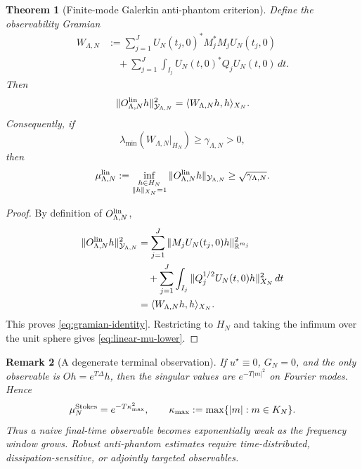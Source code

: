 \documentclass[11pt]{article}
\numberwithin{equation}{section}
\newtheorem{theorem}{Theorem}[section]
\newtheorem{remark}[theorem]{Remark}
\newcommand{\R}{\mathbb R}
\newcommand{\dd}{\,d}
\newcommand{\calY}{\mathcal Y}
\begin{document}
\begin{theorem}[Finite-mode Galerkin anti-phantom criterion]\label{thm:finite-mode-antiphantom}
Define the observability Gramian
\begin{align}\label{eq:finite-gramian}
    W_{\Lambda,N}
    &:=
    \sum_{j=1}^J
    U_N(t_j,0)^*M_j^*M_jU_N(t_j,0)
    \\
    &\quad+
    \sum_{j=1}^J
    \int_{I_j}
    U_N(t,0)^*Q_jU_N(t,0)\dd t .
\end{align}
Then
\begin{equation}\label{eq:gramian-identity}
    \|O^{\rm lin}_{\Lambda,N}h\|_{\calY_{\Lambda,N}}^2
    =
    \langle W_{\Lambda,N}h,h\rangle_{X_N}.
\end{equation}
Consequently, if
\begin{equation}\label{eq:linear-gap-assumption}
    \lambda_{\min}\left(W_{\Lambda,N}|_{H_N}\right)
    \ge
    \gamma_{\Lambda,N}>0,
\end{equation}
then
\begin{equation}\label{eq:linear-mu-lower}
    \mu^{\rm lin}_{\Lambda,N}
    :=
    \inf_{\substack{h\in H_N\\ \|h\|_{X_N}=1}}
    \|O^{\rm lin}_{\Lambda,N}h\|_{\calY_{\Lambda,N}}
    \ge
    \sqrt{\gamma_{\Lambda,N}}.
\end{equation}
\end{theorem}

\begin{proof}
By definition of $O^{\rm lin}_{\Lambda,N}$,
\begin{align*}
    \|O^{\rm lin}_{\Lambda,N}h\|_{\calY_{\Lambda,N}}^2
    &=
    \sum_{j=1}^J
    \|M_jU_N(t_j,0)h\|_{\R^{m_j}}^2
    \\
    &\quad+
    \sum_{j=1}^J
    \int_{I_j}
    \|Q_j^{1/2}U_N(t,0)h\|_{X_N}^2\dd t \\
    &=
    \langle W_{\Lambda,N}h,h\rangle_{X_N}.
\end{align*}
This proves \eqref{eq:gramian-identity}.  Restricting to $H_N$ and taking the infimum over the unit sphere gives \eqref{eq:linear-mu-lower}.
\end{proof}

\begin{remark}[A degenerate terminal observation]
If $u^\star\equiv0$, $G_N=0$, and the only observable is $Oh=e^{T\Delta}h$, then the singular values are $e^{-T|m|^2}$ on Fourier modes.  Hence
\[
    \mu^{\rm Stokes}_{N}=e^{-T\kappa_{\max}^2},
    \qquad
    \kappa_{\max}:=\max\{|m|:m\in K_N\}.
\]
Thus a naive final-time observable becomes exponentially weak as the frequency window grows.  Robust anti-phantom estimates require time-distributed, dissipation-sensitive, or adjointly targeted observables.
\end{remark}
\end{document}
